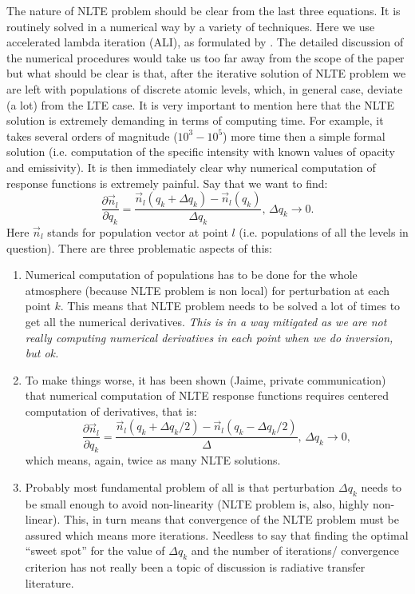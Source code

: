 \documentclass[referee]{aa}
\begin{document}
The nature of NLTE problem should be clear from the last three equations. It is routinely solved in a numerical way by a variety of techniques. Here we use accelerated lambda iteration (ALI), as formulated by \citet{RH1} \citep[for an excellent review see also][]{Hubeny03}. The detailed discussion of the numerical procedures would take us too far away from the scope of the paper but what should be clear is that, after the iterative solution of NLTE problem we are left with populations of discrete atomic levels, which, in general case, deviate (a lot) from the LTE case. It is very important to mention here that the NLTE solution is extremely demanding in terms of computing time. For example, it takes several orders of magnitude ($10^3 - 10^5$) more time then a simple formal solution (i.e. computation of the specific intensity with known values of opacity and emissivity). It is then immediately clear why numerical computation of response functions is extremely painful. Say that we want to find:
\begin{equation}
 \frac{\partial\vec{n}_l}{\partial q_k} = \frac{\vec{n}_l(q_k + \Delta q_k) - \vec{n}_l(q_k)}{\Delta q_k},\,\Delta q_k \rightarrow 0.
\end{equation}
Here $\vec{n}_l$ stands for population vector at point $l$ (i.e. populations of all the levels in question). There are three problematic aspects of this:
\begin{enumerate}
 \item Numerical computation of populations has to be done for the whole atmosphere (because NLTE problem is non local) for perturbation at each point $k$. This means that NLTE problem needs to be solved a lot of times to get all the numerical derivatives. \emph{This is in a way mitigated as we are not really computing numerical derivatives in each point when we do inversion, but ok.} 
 \item To make things worse, it has been shown (Jaime, private communication) that numerical computation of NLTE response functions requires centered computation of derivatives, that is:
 \begin{equation}
 \frac{\partial\vec{n}_l}{\partial q_k} = \frac{\vec{n}_l(q_k + \Delta q_k/2) - \vec{n}_l(q_k - \Delta q_k /2)}{\Delta},\,\Delta q_k \rightarrow 0,
  \end{equation}
which means, again, twice as many NLTE solutions.
\item Probably most fundamental problem of all is that perturbation $\Delta q_k$ needs to be small enough to avoid non-linearity (NLTE problem is, also, highly non-linear). This, in turn means that convergence of the NLTE problem must be assured which means more iterations. Needless to say that finding the optimal ``sweet spot'' for the value of $\Delta q_k$ and the number of iterations/ convergence criterion has not really been a topic of discussion is radiative transfer literature. 
\end{enumerate}
\end{document}
